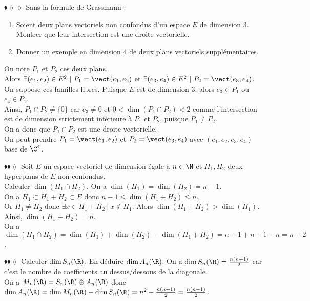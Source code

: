 \documentclass[11pt]{article}
\begin{document}
\begin{exercice}{$\blacklozenge\lozenge\lozenge$}{}
    Sans la formule de Grassmann :
    \begin{enumerate}
        \item Soient deux plans vectoriels non confondus d'un espace $E$ de dimension 3. Montrer que leur intersection est une droite vectorielle.
        \item Donner un exemple en dimension 4 de deux plans vectoriels supplémentaires.
    \end{enumerate}
    \tcblower
     On note $P_1$ et $P_2$ ces deux plans.\\
    Alors $\exists (e_1, e_2) \in E^2 ~ | ~ P_1 = \vect(e_1, e_2)$ et $\exists (e_3, e_4) \in E^2 ~ | ~ P_2 = \vect(e_3, e_4)$.\\
    On suppose ces familles libres. Puisque $E$ est de dimension 3, alors $e_3 \in P_1$ ou $e_4 \in P_1$.\\
    Ainsi, $P_1 \cap P_2 \neq \{0\}$ car $e_3 \neq 0$ et $0<\dim(P_1 \cap P_2)<2$ comme l'intersection est de dimension strictement inférieure à $P_1$ et $P_2$, puisque $P_1 \neq P_2$.\\
    On a donc que $P_1 \cap P_2$ est une droite vectorielle.\\[0.2cm]
     On peut prendre $P_1 = \vect(e_1, e_2)$ et $P_2 = \vect(e_3, e_4)$ avec $(e_1, e_2, e_3, e_4)$ base de $\C^4$.
\end{exercice}

\pagebreak

\begin{exercice}{$\blacklozenge\blacklozenge\lozenge$}{}
    Soit $E$ un espace vectoriel de dimension égale à $n\in\N$ et $H_1,H_2$ deux hyperplans de $E$ non confondus.\\
    Calculer $\dim(H_1 \cap H_2)$.
    \tcblower
    On a $\dim(H_1) = \dim(H_2) = n-1$.\\
    On a $H_1 \subset H_1 + H_2 \subset E$ donc $n-1 \leq \dim(H_1 + H_2) \leq n$.\\
    Or $H_1 \neq H_2$ donc $\exists x \in H_1 + H_2 ~ | ~ x \notin H_1$. Alors $\dim(H_1 + H_2) > \dim(H_1)$.\\
    Ainsi, $\dim(H_1 + H_2) = n$.\\
    On a $\dim(H_1 \cap H_2) = \dim(H_1) + \dim(H_2) - \dim(H_1 + H_2) = n - 1 + n - 1 - n = n - 2$.
\end{exercice}

\begin{exercice}{$\blacklozenge\blacklozenge\lozenge$}{}
    Calculer $\dim S_n(\R)$. En déduire $\dim A_n(\R)$.
    \tcblower
    On a $\dim S_n(\R) = \frac{n(n+1)}{2}$ car c'est le nombre de coefficients au dessus/dessous de la diagonale.\\
    On a $M_n(\R) = S_n(\R) \oplus A_n(\R)$ donc $\dim A_n(\R) = \dim M_n(\R) - \dim S_n(\R) = n^2 - \frac{n(n+1)}{2} = \frac{n(n-1)}{2}$.
\end{exercice}
\end{document}
